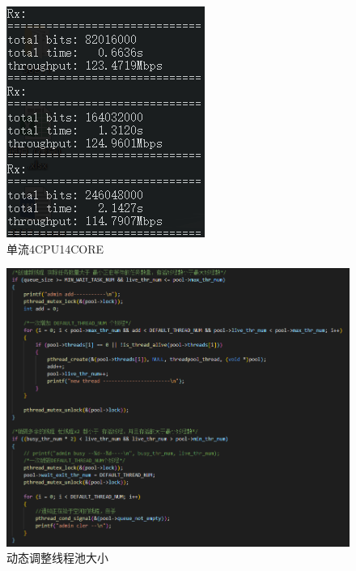 \documentclass{article}
\begin{document}
\begin{figure}[H]
\begin{minipage}[t]{0.48\textwidth}
		\includegraphics[width = \textwidth]{rxs414.png}
		\caption{单流4CPU14CORE}
	\end{minipage}
\end{figure}
\begin{figure}[H]
	\centering
	\includegraphics[width = \textwidth]{adm.png}
	\caption{动态调整线程池大小}
\end{figure}
\end{document}

